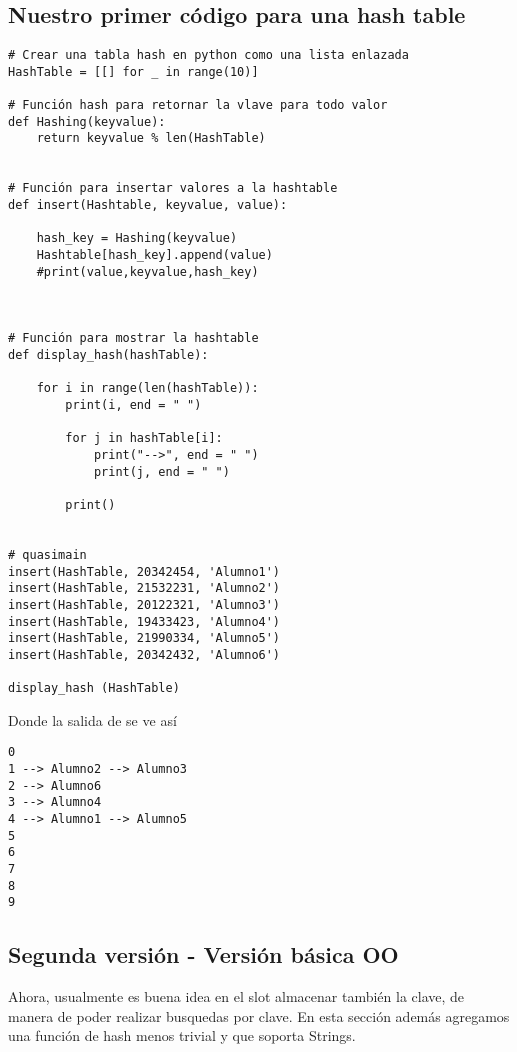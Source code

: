 \subsection{Nuestro primer código para una hash table}
\begin{lstlisting}
# Crear una tabla hash en python como una lista enlazada
HashTable = [[] for _ in range(10)]
  
# Función hash para retornar la vlave para todo valor 
def Hashing(keyvalue):
    return keyvalue % len(HashTable)
  
  
# Función para insertar valores a la hashtable 
def insert(Hashtable, keyvalue, value):
      
    hash_key = Hashing(keyvalue)
    Hashtable[hash_key].append(value)
    #print(value,keyvalue,hash_key)
    
    

# Función para mostrar la hashtable 
def display_hash(hashTable):
      
    for i in range(len(hashTable)):
        print(i, end = " ")
          
        for j in hashTable[i]:
            print("-->", end = " ")
            print(j, end = " ")
              
        print()
  

# quasimain
insert(HashTable, 20342454, 'Alumno1')
insert(HashTable, 21532231, 'Alumno2')
insert(HashTable, 20122321, 'Alumno3')
insert(HashTable, 19433423, 'Alumno4')
insert(HashTable, 21990334, 'Alumno5')
insert(HashTable, 20342432, 'Alumno6')
  
display_hash (HashTable)
\end{lstlisting}

Donde la salida de  se ve así

\begin{lstlisting}
0 
1 --> Alumno2 --> Alumno3 
2 --> Alumno6 
3 --> Alumno4 
4 --> Alumno1 --> Alumno5 
5 
6 
7 
8 
9 
\end{lstlisting}














\subsection{Segunda versión -  Versión básica OO }
Ahora, usualmente es buena idea en el slot almacenar también la clave, de manera de poder realizar busquedas por clave. En esta sección además agregamos una función de hash menos trivial y que soporta Strings. 

